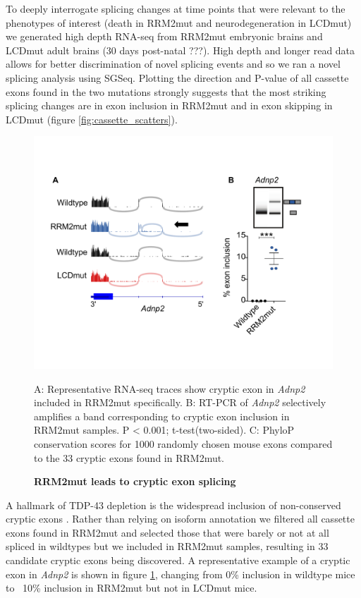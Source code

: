 To deeply interrogate splicing changes at time points that were relevant to the phenotypes of interest (death in RRM2mut and neurodegeneration in LCDmut) we generated high depth RNA-seq from RRM2mut embryonic brains and LCDmut adult brains (30 days post-natal ???). High depth and longer read data allows for better discrimination of novel splicing events and so we ran a novel splicing analysis using SGSeq. Plotting the direction and P-value of all cassette exons found in the two mutations strongly suggests that the most striking splicing changes are in exon inclusion in RRM2mut and in exon skipping in LCDmut (figure \ref{fig:cassette_scatters}).

\begin{figure}[h!]
	\centering
	\includegraphics[width=14cm]{Figures/05_tdp_mice/cryptic_exon_multi.png}
	\caption{\textbf{RRM2mut leads to cryptic exon splicing}}
	\label{cryptic_multi}
	A: Representative RNA-seq traces show cryptic exon in \textit{Adnp2} included in RRM2mut specifically. B: RT-PCR of \textit{Adnp2} selectively amplifies a band corresponding to cryptic exon inclusion in RRM2mut samples. P < 0.001; t-test(two-sided). C: PhyloP conservation scores for 1000 randomly chosen mouse exons compared to the 33 cryptic exons found in RRM2mut.
\end{figure}

A hallmark of TDP-43 depletion is the widespread inclusion of non-conserved cryptic exons \citep{Ling2015}. Rather than relying on isoform annotation we filtered all cassette exons found in RRM2mut and selected those that were barely or not at all spliced in wildtypes but we included in RRM2mut samples, resulting in 33 candidate cryptic exons being discovered. A representative example of a cryptic exon in \textit{Adnp2} is shown in figure \ref{cryptic_multi}, changing from 0\% inclusion in wildtype mice to ~10\% inclusion in RRM2mut but not in LCDmut mice.  

